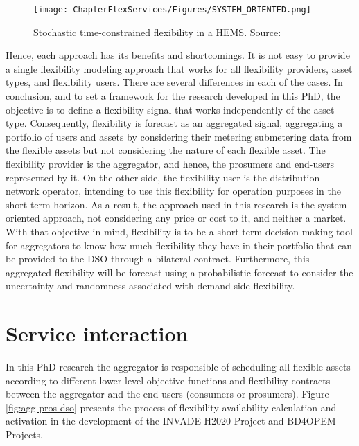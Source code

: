 \begin{figure}[htbp]
	\centering
	\texttt{[image: ChapterFlexServices/Figures/SYSTEM\_ORIENTED.png]}
		\caption{Stochastic time-constrained flexibility in a HEMS. Source: \cite{Pinto2017}}
	\label{fig:system}  
\end{figure}

Hence, each approach has its benefits and shortcomings. It is not easy to provide a single flexibility modeling approach that works for all flexibility providers, asset types, and flexibility users. There are several differences in each of the cases. In conclusion, and to set a framework for the research developed in this PhD, the objective is to define a flexibility signal that works independently of the asset type. Consequently, flexibility is forecast as an aggregated signal, aggregating a portfolio of users and assets by considering their metering submetering data from the flexible assets but not considering the nature of each flexible asset. 
The flexibility provider is the aggregator, and hence, the prosumers and end-users represented by it. On the other side, the flexibility user is the distribution network operator, intending to use this flexibility for operation purposes in the short-term horizon. As a result, the approach used in this research is the system-oriented approach, not considering any price or cost to it, and neither a market. With that objective in mind, flexibility is to be a short-term decision-making tool for aggregators to know how much flexibility they have in their portfolio that can be provided to the DSO through a bilateral contract. Furthermore, this aggregated flexibility will be forecast using a probabilistic forecast to consider the uncertainty and randomness associated with demand-side flexibility. 

\section{Service interaction}

In this PhD research the aggregator is responsible of scheduling all flexible assets according to different lower-level objective functions and flexibility contracts between the aggregator and the end-users (consumers or prosumers). Figure \ref{fig:agg-pros-dso} presents the process of flexibility availability calculation and activation in the development of the INVADE H2020 Project and BD4OPEM Projects. 

